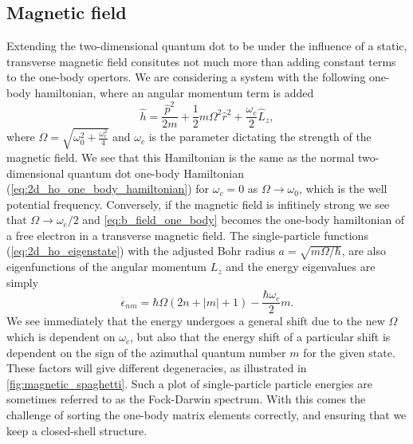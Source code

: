 

\subsection{Magnetic field}

Extending the two-dimensional quantum dot to be under the influence of a 
static, transverse magnetic field consitutes not much more than adding constant 
terms to the one-body opertors. We are considering a system with 
the following one-body hamiltonian, where an angular momentum term is added
\begin{equation}
    \label{eq:b_field_one_body}
    \hat{h} = \frac{\hat{p}^2}{2m} + \frac{1}{2}m\Omega^2\hat{r}^2 
        + \frac{\omega_c}{2}\hat{L}_z,   
\end{equation}
where $\Omega = \sqrt{\omega_0^2 + \frac{\omega_c^2}{4}}$ and $\omega_c$ is the 
parameter dictating the strength of the magnetic field. We see that this Hamiltonian
is the same as the normal two-dimensional quantum dot one-body Hamiltonian 
(\autoref{eq:2d_ho_one_body_hamiltonian}) for $\omega_c = 0$ as $\Omega \to \omega_0$,
which is the well potential frequency. Conversely, if the 
magnetic field is infitinely strong we see that $\Omega \to \omega_c/2$ and 
\autoref{eq:b_field_one_body} becomes the one-body hamiltonian of a free electron in 
a transverse magnetic field.
The single-particle functions 
(\autoref{eq:2d_ho_eigenstate}) with the adjusted Bohr radius $a=\sqrt{m\Omega/\hbar}$,
are also eigenfunctions of the angular momentum
$L_z$ and the energy eigenvalues are simply
\begin{equation}
    \label{eq:2d_b_eigenvalues}
    \epsilon_{nm} = \hbar\Omega(2n + |m| + 1) - \frac{\hbar\omega_c}{2}m.
\end{equation}
We see immediately that the energy undergoes a general shift due to the new $\Omega$
which is dependent on $\omega_c$, but also that the energy shift of a particular shift 
is dependent on the sign of the azimuthal quantum number $m$ for the given state. These 
factors will give different degeneracies, as illustrated in \autoref{fig:magnetic_spaghetti}.
Such a plot of single-particle particle energies are sometimes referred to as the 
Fock-Darwin spectrum\cite{fock1928bemerkung,darwin1931diamagnetism}.
With this comes the challenge of sorting the one-body matrix elements correctly, 
and ensuring that we keep a closed-shell structure.

